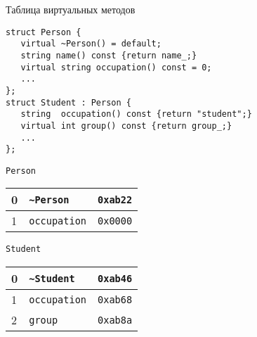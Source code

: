 \documentclass{beamer}
\begin{document}
\begin{frame}[fragile]{Таблица виртуальных методов}
    \begin{lstlisting}
struct Person {
   virtual ~Person() = default;
   string name() const {return name_;}
   virtual string occupation() const = 0;
   ...
};
struct Student : Person {
   string  occupation() const {return "student";}
   virtual int group() const {return group_;}
   ...
};
    \end{lstlisting}

\begin{minipage}{35mm}
    {\tt Person}
    \begin{tabular}{|l|l|l|}
        \hline
        0 & \texttt{\textasciitilde{}Person}   & \texttt{0xab22} \\\hline
        1 & \texttt{occupation} & \texttt{0x0000} \\\hline
    \end{tabular}\vspace{4.8mm}\mbox{}
\end{minipage}\hspace{2cm}
\begin{minipage}{3cm}
    {\tt Student}
    \begin{tabular}{|l|l|l|}
        \hline
        0 & \texttt{\textasciitilde{}Student} &  \texttt{0xab46} \\\hline
        1 & \texttt{occupation} & \texttt{0xab68} \\\hline
        2 & \texttt{group} & \texttt{0xab8a}     \\\hline
    \end{tabular}
\end{minipage}
\end{frame}
\end{document}
